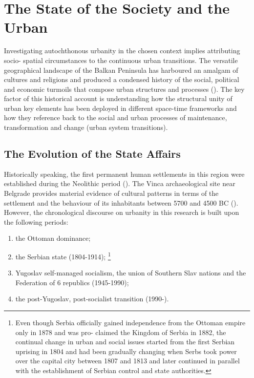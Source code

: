 \documentclass[11pt]{report}
\begin{document}
{{{{\section{The State of the Society and the Urban}


Investigating autochthonous urbanity in the chosen context implies attributing socio- spatial circumstances to the continuous urban transitions. The versatile geographical landscape of the Balkan Peninsula has harboured an amalgam of cultures and religions and produced a condensed history of the social, political and economic turmoils that compose urban  structures and processes (\href{Nedovic}{\citealt{nedovicbudic_waves_2006}}).
The key factor of this historical account is understanding how the structural unity of urban key elements has been deployed in different space-time frameworks and how they reference back to the social and urban processes of maintenance, transformation and change (urban system transitions).

\subsection{The Evolution of the State Affairs}

Historically speaking, the first permanent human settlements in this region were established during the  Neolithic  period (\href{Krstic}{\citealt{krstic_planerski_1972}}). The Vinca archaeological site near Belgrade provides material evidence of cultural patterns in terms of the settlement and the behaviour of its inhabitants between 5700 and 4500 BC  (\href{Srejovic}{\citealt{srejovic_vinca_1984}}).
\\

However, the chronological discourse on urbanity in this research is built upon the following periods:

\begin{enumerate}
\item the Ottoman dominance;
\item the Serbian state (1804-1914);
\footnote{Even though Serbia officially gained independence from the Ottoman empire only in 1878 and was pro-
claimed the Kingdom of Serbia in 1882, the continual change in urban and social issues started from the first Serbian uprising in 1804 and had been gradually changing when Serbs took power over the capital city between 1807 and 1813 and later continued in parallel with the establishment of Serbian control and state authorities.}
\item Yugoslav self-managed socialism, the union of Southern Slav nations and the Federation of 6 republics (1945-1990);
\item the post-Yugoslav, post-socialist transition (1990-).
\end{enumerate}

}}}}
\end{document}

